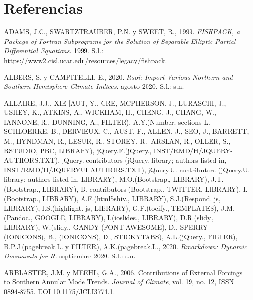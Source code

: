 \documentclass[12pt,oneside,a4paper]{reedthesis}
\newlength{\cslhangindent}
\newenvironment{CSLReferences}[2] %
 {%
  \setlength{\parindent}{0pt}
  \ifodd #1 \everypar{\setlength{\hangindent}{\cslhangindent}}\ignorespaces\fi
  \ifnum #2 > 0
  \setlength{\parskip}{#2\baselineskip}
  \fi
 }%
 {}
\begin{document}
\backmatter

\hypertarget{referencias}{%
\chapter*{Referencias}\label{referencias}}


\noindent

\setlength{\parindent}{-0.20in}

\hypertarget{refs}{}
\begin{CSLReferences}{1}{0}
\leavevmode{}%
ADAMS, J.C., SWARTZTRAUBER, P.N. y SWEET, R., 1999. \emph{{FISHPACK}, a Package of {Fortran} Subprograms for the Solution of Separable Elliptic Partial Differential Equations}. 1999. S.l.: https://www2.cisl.ucar.edu/resources/legacy/fishpack.

\leavevmode{}%
ALBERS, S. y CAMPITELLI, E., 2020. \emph{Rsoi: {Import Various Northern} and {Southern Hemisphere Climate Indices}}. agosto 2020. S.l.: s.n.

\leavevmode{}%
ALLAIRE, J.J., XIE {[}AUT, Y., CRE, MCPHERSON, J., LURASCHI, J., USHEY, K., ATKINS, A., WICKHAM, H., CHENG, J., CHANG, W., IANNONE, R., DUNNING, A., FILTER), A.Y.(Number. sections L., SCHLOERKE, B., DERVIEUX, C., AUST, F., ALLEN, J., SEO, J., BARRETT, M., HYNDMAN, R., LESUR, R., STOREY, R., ARSLAN, R., OLLER, S., RSTUDIO, PBC, LIBRARY), jQuery.F.(jQuery., INST/RMD/H/JQUERY-AUTHORS.TXT), jQuery. contributors (jQuery. library; authors listed in, INST/RMD/H/JQUERYUI-AUTHORS.TXT), jQuery.U. contributors (jQuery.U. library; authors listed in, LIBRARY), M.O.(Bootstrap., LIBRARY), J.T.(Bootstrap., LIBRARY), B. contributors (Bootstrap., TWITTER, LIBRARY), I.(Bootstrap., LIBRARY), A.F.(html5shiv., LIBRARY), S.J.(Respond. js, LIBRARY), I.S.(highlight. js, LIBRARY), G.F.(tocify., TEMPLATES), J.M.(Pandoc., GOOGLE, LIBRARY), I.(ioslides., LIBRARY), D.R.(slidy., LIBRARY), W.(slidy., GANDY (FONT-AWESOME), D., SPERRY (IONICONS), B., (IONICONS), D., STICKYTABS), A.L.(jQuery., FILTER), B.P.J.(pagebreak.L. y FILTER), A.K.(pagebreak.L., 2020. \emph{Rmarkdown: {Dynamic Documents} for {R}}. septiembre 2020. S.l.: s.n.

\leavevmode{}%
ARBLASTER, J.M. y MEEHL, G.A., 2006. Contributions of {External Forcings} to {Southern Annular Mode Trends}. \emph{Journal of Climate}, vol. 19, no. 12, ISSN 0894-8755. DOI \href{https://doi.org/10.1175/JCLI3774.1}{10.1175/JCLI3774.1}.


\end{CSLReferences}
\end{document}
